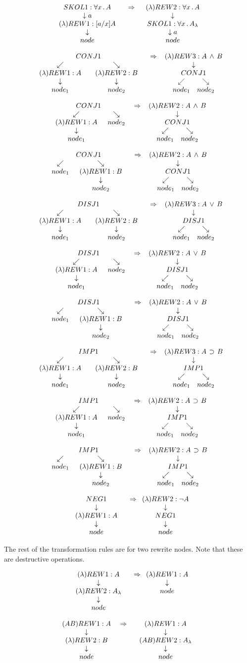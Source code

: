 $$\skol{1}{\forall x \, . \, A}{a}{\erew{1}{\lambda}{[a/x]A}{node}} \Rightarrow 
\erew{2}{\lambda}{\forall x \, . \, A}{\skol{1}{\forall x \, . \, A_\lambda}{a}{node}}$$

$$\econj{1}{A\, \land\, B}{\erew{1}{\lambda}{A}{node_1}}{\erew{2}{\lambda}{B}{node_2}}
\Rightarrow 
\erew{3}{\lambda}{A\, \land\, B}{\econj{1}{A_\lambda \, \land\, B_\lambda}{node_1}{node_2}}$$

$$\econj{1}{A\,\land\, B}{\erew{1}{\lambda}{A}{node_1}}{node_2}
\Rightarrow \erew{2}{\lambda}{A\,\land\, B}{\econj{1}{A_\lambda \,\land\, B}{node_1}{node_2}}$$

$$\econj{1}{A\,\land\, B}{node_1}{\erew{1}{\lambda}{B}{node_2}}
\Rightarrow \erew{2}{\lambda}{A\,\land\, B}{\econj{1}{A \,\land\, B_\lambda}{node_1}{node_2}}$$

$$\edisj{1}{A\, \lor\, B}{\erew{1}{\lambda}{A}{node_1}}{\erew{2}{\lambda}{B}{node_2}}
\Rightarrow 
\erew{3}{\lambda}{A\, \lor\, B}{\edisj{1}{A_\lambda \, \lor\, B_\lambda}{node_1}{node_2}}$$

$$\edisj{1}{A\,\lor\, B}{\erew{1}{\lambda}{A}{node_1}}{node_2}
\Rightarrow \erew{2}{\lambda}{A\,\lor\, B}{\edisj{1}{A_\lambda \,\lor\, B}{node_1}{node_2}}$$

$$\edisj{1}{A\,\lor\, B}{node_1}{\erew{1}{\lambda}{B}{node_2}}
\Rightarrow \erew{2}{\lambda}{A\,\lor\, B}{\edisj{1}{A \,\lor\, B_\lambda}{node_1}{node_2}}$$

$$\eimp{1}{A\, \limplies\, B}{\erew{1}{\lambda}{A}{node_1}}{\erew{2}{\lambda}{B}{node_2}}
\Rightarrow 
\erew{3}{\lambda}{A\, \limplies\, B}{\eimp{1}{A_\lambda \, \limplies\, B_\lambda}{node_1}{node_2}}$$

$$\eimp{1}{A\,\limplies\, B}{\erew{1}{\lambda}{A}{node_1}}{node_2}
\Rightarrow \erew{2}{\lambda}{A\,\limplies\, B}{\eimp{1}{A_\lambda \,\limplies\, B}{node_1}{node_2}}$$

$$\eimp{1}{A\,\limplies\, B}{node_1}{\erew{1}{\lambda}{B}{node_2}}
\Rightarrow \erew{2}{\lambda}{A\,\limplies\, B}{\eimp{1}{A \,\limplies\, B_\lambda}{node_1}{node_2}}$$

$$\eneg{1}{\lnot A}{\erew{1}{\lambda}{A}{node}}
\Rightarrow \erew{2}{\lambda}{\lnot A}{\eneg{1}{\lnot A_\lambda}{node}}$$

The rest of the transformation rules are for two rewrite nodes.
Note that these are destructive operations.

$$\erew{1}{\lambda}{A}{\erew{2}{\lambda}{A_\lambda}{node}} \Rightarrow
\erew{1}{\lambda}{A}{node}$$

$$\erew{1}{AB}{A}{\erew{2}{\lambda}{B}{node}} \Rightarrow
\erew{1}{\lambda}{A}{\erew{2}{AB}{A_\lambda}{node}}$$

